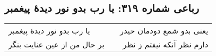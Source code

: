 \begin{center}
\section*{رباعی شماره ۳۱۹: یا رب بدو نور دیدهٔ پیغمبر}
\label{sec:sh319}
\begin{longtable}{l p{0.5cm} r}
یا رب بدو نور دیدهٔ پیغمبر
&&
یعنی بدو شمع دودمان حیدر
\\
بر حال من از عین عنایت بنگر
&&
دارم نظر آنکه نیفتم ز نظر
\\
\end{longtable}
\end{center}
